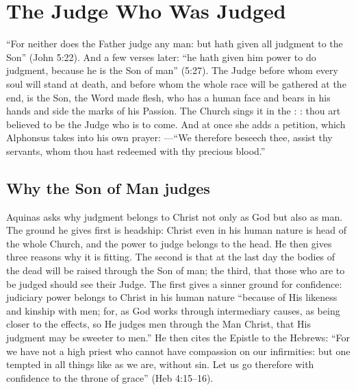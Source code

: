 \section{The Judge Who Was Judged}\label{sec:judge}

``For neither does the Father judge any man: but hath given all judgment to the Son'' (John 5:22). And a few verses later: ``he hath given him power to do judgment, because he is the Son of man'' (5:27). The Judge before whom every soul will stand at death, and before whom the whole race will be gathered at the end, is the Son, the Word made flesh, who has a human face and bears in his hands and side the marks of his Passion. The Church sings it in the : : thou art believed to be the Judge who is to come. And at once she adds a petition, which Alphonsus takes into his own prayer: ---``We therefore beseech thee, assist thy servants, whom thou hast redeemed with thy precious blood.''

\subsection{Why the Son of Man judges}

Aquinas asks why judgment belongs to Christ not only as God but also as man. The ground he gives first is headship: Christ even in his human nature is head of the whole Church, and the power to judge belongs to the head. He then gives three reasons why it is fitting. The second is that at the last day the bodies of the dead will be raised through the Son of man; the third, that those who are to be judged should see their Judge. The first gives a sinner ground for confidence: judiciary power belongs to Christ in his human nature ``because of His likeness and kinship with men; for, as God works through intermediary causes, as being closer to the effects, so He judges men through the Man Christ, that His judgment may be sweeter to men.'' He then cites the Epistle to the Hebrews: ``For we have not a high priest who cannot have compassion on our infirmities: but one tempted in all things like as we are, without sin. Let us go therefore with confidence to the throne of grace'' (Heb 4:15--16).

